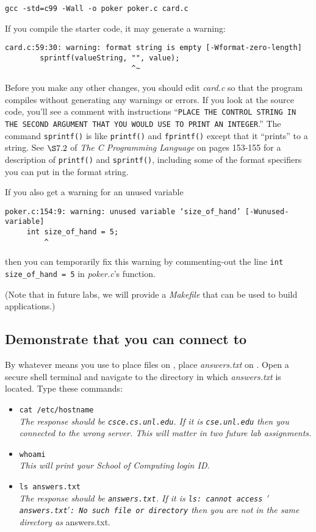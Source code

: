\texttt{gcc -std=c99 -Wall -o poker poker.c card.c}

If you compile the starter code, it may generate a warning:

\begin{verbatim}
card.c:59:30: warning: format string is empty [-Wformat-zero-length]
        sprintf(valueString, "", value);
                             ^~
\end{verbatim}

Before you make any other changes, you should edit \textit{card.c} so that the
program compiles without generating any warnings or errors. If you look at the
source code, you'll see a comment with instructions ``\texttt{PLACE THE CONTROL
STRING IN THE SECOND ARGUMENT THAT YOU WOULD USE TO PRINT AN INTEGER}.'' The
command \lstinline{sprintf()} is like \lstinline{printf()} and
\lstinline{fprintf()} except that it ``prints'' to a string. See $\S7.2$ of
\textit{The C Programming Language} on pages 153-155 for a description of
\lstinline{printf()} and \lstinline{sprintf()}, including some of the format
specifiers you can put in the format string.

If you also get a warning for an unused variable
\begin{verbatim}
poker.c:154:9: warning: unused variable ‘size_of_hand’ [-Wunused-variable]
     int size_of_hand = 5;
         ^
\end{verbatim}
then you can temporarily fix this warning by commenting-out the line
\lstinline{int size_of_hand = 5} in \textit{poker.c}'s 
function.

(Note that in future labs, we will provide a \textit{Makefile} that can be used
to build applications.)

\subsection*{Demonstrate that you can connect to \runtimeenvironment}

By whatever means you use to place files on \runtimeenvironment, place
\textit{answers.txt} on \runtimeenvironment. Open a secure shell terminal and
navigate to the directory in which \textit{answers.txt} is located. Type these
commands:
\begin{itemize}
\item[]\texttt{cat /etc/hostname} \\
\textit{The response should be \texttt{csce.cs.unl.edu}. If it is
\texttt{cse.unl.edu} then you connected to the wrong server. This will matter
in two future lab assignments.}
\item[]\texttt{whoami} \\
\textit{This will print your School of Computing login ID.}
\item[]\texttt{ls answers.txt} \\
\textit{The response should be \texttt{answers.txt}. If it is \texttt{ls:
cannot access $'$answers.txt$'$: No such file or directory} then you are not in
the same directory as} answers.txt.
\end{itemize}


